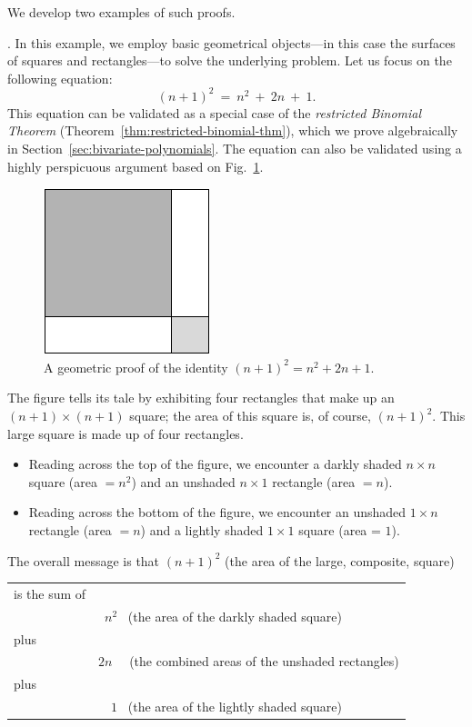 We develop two examples of such proofs.

\medskip

.
In this example, we employ basic geometrical objects---in this case
the surfaces of squares and rectangles---to solve the underlying
problem.  Let us focus on the following equation:
\begin{equation}
(n+1)^2 \ = \ n^2 \ + \ 2n \ + \ 1.
\end{equation}
This equation can be validated as a special case of the {\em
  restricted Binomial Theorem}
(Theorem~\ref{thm:restricted-binomial-thm}), which we prove
algebraically in Section~\ref{sec:bivariate-polynomials}.  The
equation can also be validated using a highly perspicuous argument
based on Fig.~\ref{fig:proofa2plusb2}.
\begin{figure}[ht]
\begin{center}
       \includegraphics[scale=0.4]{FiguresMaths/proofa2plusb2}
\caption{A geometric proof of the identity $(n+1)^2 = n^2 + 2n + 1$.}
       \label{fig:proofa2plusb2}
\end{center}
\end{figure}
The figure tells its tale by exhibiting four rectangles that make up
an $(n+1) \times (n+1)$ square; the area of this square is, of course,
$(n+1)^2$.  This large square is made up of four rectangles.
\begin{itemize}
\item
Reading across the top of the figure, we encounter a darkly shaded $n
\times n$ square (area $= n^2$) and an unshaded $n \times 1$ rectangle
(area $= n$).
\item
Reading across the bottom of the figure, we encounter an unshaded $1
\times n$ rectangle (area $= n$) and a lightly shaded $1 \times 1$
square (area = $1$).
\end{itemize}
The overall message is that $(n+1)^2$ (the area of the large,
composite, square)

\begin{tabular}{ll}
is the sum of & \\
  & \ $n^2$ \ (the area of the darkly shaded square) \\
plus & \\
  & $2n$ \ \ (the combined areas of the unshaded rectangles) \\
plus & \\
  & \ \ $1$ \ (the area of the lightly shaded square)
\end{tabular}

